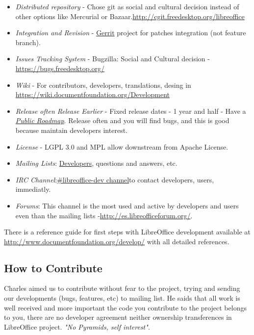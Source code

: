 \begin{itemize}
	\item \textit{Distributed repository} - Chose git as social and cultural decision instead of other options like Mercurial or Bazaar.\url{http://cgit.freedesktop.org/libreoffice}
	\item \textit{Integration and Revision} - \href{https://gerrit.libreoffice.org/}{Gerrit} project for patches integration (not feature branch).
	\item \textit{Issues Tracking System} - Bugzilla: Social and Cultural decision - \url{https://bugs.freedesktop.org/}
	\item \textit{Wiki} - For contributors, developers, translations, desing in \url{https://wiki.documentfoundation.org/Development}
	\item \textit{Release often Release Earlier} - Fixed release dates - 1 year and half - Have a \textit{\href{https://wiki.documentfoundation.org/ReleasePlan}{Public Roadmap}}. Release often and you will find bugs, and this is good because maintain developers interest.
	\item \textit{License} - LGPL 3.0 and MPL allow downstream from Apache License.
	\item \textit{Mailing Lists}: \href{http://lists.freedesktop.org/mailman/listinfo/libreoffice}{Developers}, questions and answers, etc.
	\item \textit{IRC Channel}:\href{irc://chat.freenode.net/libreoffice-dev}{\#libreoffice-dev channel}to contact developers, users, immediatly.
	\item \textit{Forums}: This channel is the most used and active by developers and users even than the mailing lists -\url{http://es.libreofficeforum.org/}.
\end{itemize} There is a reference guide for first steps with LibreOffice development available at \url{http://www.documentfoundation.org/develop/} with all detailed references.

\subsection{How to Contribute}

\par Charles aimed us to contribute without fear to the project, trying and sending our developments (bugs, features, etc) to mailing list. He saids that all work is well received and more important the code you contribute to the project belongs to you, there are no developer agreement neither ownership transferences in LibreOffice project. \textit{"No Pyramids, self interest"}.

